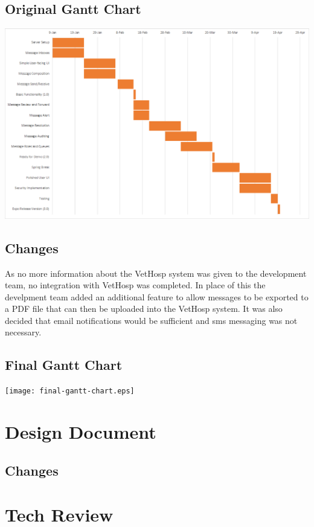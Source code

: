 \documentclass[onecolumn, draftclsnofoot,10pt, compsoc]{IEEEtran}
\begin{document}
\subsection{Original Gantt Chart}
\includegraphics[angle=-90,origin=c,width=\textwidth,height=\textheight,keepaspectratio]{gantt-chart.eps}

\subsection{Changes}
As no more information about the VetHosp system was given to the development team, no integration with VetHosp was completed. In place of this the develpment team added an additional feature to allow messages to be exported to a PDF file that can then be uploaded into the VetHosp system. It was also decided that email notifications would be sufficient and sms messaging was not necessary.

\subsection{Final Gantt Chart}
\texttt{[image: final-gantt-chart.eps]}

\newpage
\section{Design Document}



\subsection{Changes}

\newpage
\section{Tech Review}
\end{document}
